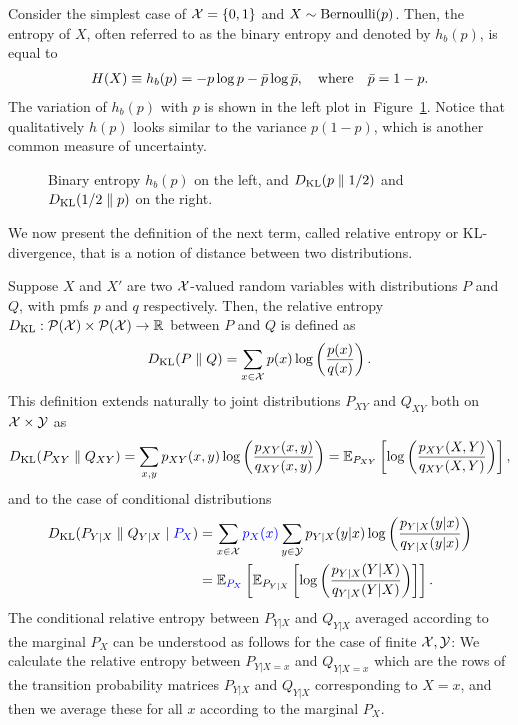 \documentclass[12pt]{article}
\begin{document}
\begin{example}
\label{example:binary-entropy} Consider the simplest case of ${\cal X} = \{0,1\}$ and $X \sim \mathrm{Bernoulli}(p)$. Then, the entropy of $X$, often referred to as the binary entropy and denoted by $h_b(p)$, is equal to 
\begin{align}
	H(X) \equiv h_b(p) = -p \log p - \bar{p} \log \bar{p}, \quad \text{where} \quad \bar{p} = 1-p. 
\end{align}
The variation of $h_b(p)$ with $p$ is shown in the left plot in~Figure~\ref{fig:binary-entropy-kl}. Notice that qualitatively $h(p)$ looks similar to the variance $p(1-p)$, which is another common measure of uncertainty. 
\end{example}

\begin{figure}[hbt!]
\centering
	\def\figheight{0.25\columnwidth} %
	
	
	\caption{Binary entropy $h_b(p)$ on the left, and $D_{\text{KL}}(p\parallel 1/2)$ and $D_{\text{KL}}(1/2 \parallel p)$ on the right.}
	\label{fig:binary-entropy-kl}
\end{figure}


We now present the definition of the next term, called relative entropy or KL-divergence, that is a notion of distance between two distributions. 

\begin{definition}
\label{def:relative-entropy-discrete} Suppose $X$ and $X'$ are two ${\cal X}$-valued random variables with distributions $P$ and $Q$, with pmfs $p$ and $q$ respectively. Then, the relative entropy $D_{\text{KL}}:{\cal P}({\cal X}) \times {\cal P}({\cal X}) \to \mathbb{R}$ between $P$ and $Q$ is defined as 
\begin{align}
D_{\text{KL}}(P \parallel Q) = \sum_{x\in {\cal X}} p(x) \log \left( \frac{p(x)}{q(x)} \right). 
\end{align}
This definition extends naturally to joint distributions $P_{XY}$ and $Q_{XY}$ both on ${\cal X} \times {\cal Y}$ as 
\begin{align}
	D_{\text{KL}}(P_{XY} \parallel Q_{XY}) = \sum_{x, y } p_{XY}(x, y) \log \left( \frac{p_{XY}(x,y)}{q_{XY}(x,y)} \right) = \mathbb{E}_{P_{XY}}\left[ \log \left( \frac{p_{XY}(X, Y)}{q_{XY}(X,Y)} \right) \right], 
\end{align}
and to the case of conditional distributions 
\begin{align}
D_{\text{KL}}(P_{Y|X} \parallel Q_{Y|X} \mid \textcolor{blue}{P_X}) &= \sum_{x \in {\cal X}} \textcolor{blue}{p_X(x)} \sum_{y \in {\cal Y}} p_{Y|X}(y|x) \log \left( \frac{p_{Y|X}(y|x)}{q_{Y|X}(y|x)} \right)  \\
& = \mathbb{E}_{\textcolor{blue}{P_X}}\left[ \mathbb{E}_{P_{Y|X}} \left[ \log \left( \frac{p_{Y|X}(Y|X)}{q_{Y|X}(Y|X)} \right) \right] \right]. 
\end{align}
The conditional relative entropy between $P_{Y|X}$ and $Q_{Y|X}$ averaged according to the marginal $P_X$ can be understood as follows for the case of finite ${\cal X}, {\cal Y}$: We calculate the relative entropy between $P_{Y|X=x}$ and $Q_{Y|X=x}$ which are the rows of the transition probability matrices $P_{Y|X}$ and $Q_{Y|X}$ corresponding to $X=x$, and then we average these for all $x$ according to the marginal $P_X$. 
\end{definition}
\end{document}
